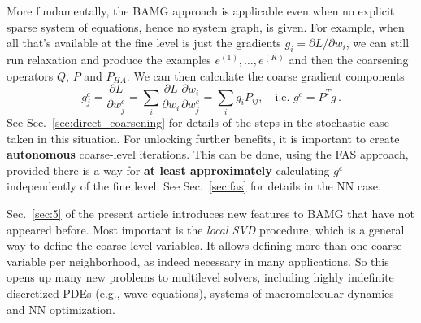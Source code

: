 \documentclass{article} %
\begin{document}
More fundamentally, the BAMG approach is applicable even when no explicit sparse system of equations, hence no system graph, is given. For example, when all that's available at the fine level is just the gradients $g_i = \partial L/\partial w_i$, we can still run relaxation and produce the examples $e^{(1)},\dots,e^{(K)}$ and then the coarsening operators $Q$, $P$ and $P_{HA}$. We can then calculate the coarse gradient components
$$
	g^c_j = \frac{\partial L}{\partial w^c_j} =
	\sum_i \frac{\partial L}{\partial w_i} \frac{\partial w_i}{\partial w_j^c} =
	\sum_i g_i P_{ij}, \quad {\mbox{i.e. }} g^c = P^T g\,.
$$
See Sec.~\ref{sec:direct_coarsening} for details of the steps in the stochastic case taken in this situation. For unlocking further benefits, it is important to create \textbf{autonomous} coarse-level iterations. This can be done, using the FAS approach, provided there is a way for \textbf{at least approximately} calculating $g^c$ independently of the fine level. See Sec.~\ref{sec:fas} for details in the NN case.

Sec.~\ref{sec:5} of the present article introduces new features to BAMG that have not appeared before. Most important is the {\it local SVD} procedure, which is a general way to define the coarse-level variables. It allows defining more than one coarse variable per neighborhood, as indeed necessary in many applications. So this opens up many new problems to multilevel solvers, including highly indefinite discretized PDEs (e.g., wave equations), systems of macromolecular dynamics and NN optimization.
\end{document}
